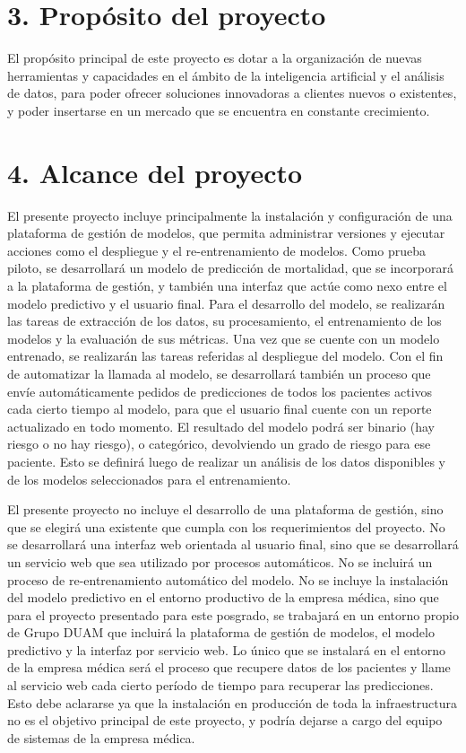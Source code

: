 \documentclass[
11pt, %
]{charter}
\begin{document}
\section{3. Propósito del proyecto}
\label{sec:proposito}

El propósito principal de este proyecto es dotar a la organización de nuevas herramientas y capacidades en el ámbito de la inteligencia artificial y el análisis de datos, para poder ofrecer soluciones innovadoras a clientes nuevos o existentes, y poder insertarse en un mercado que se encuentra en constante crecimiento. 

\section{4. Alcance del proyecto}
\label{sec:alcance}

El presente proyecto incluye principalmente la instalación y configuración de una plataforma de gestión de modelos, que permita administrar versiones y ejecutar acciones como el despliegue y el re-entrenamiento de modelos.
Como prueba piloto, se desarrollará un modelo de predicción de mortalidad, que se incorporará a la plataforma de gestión, y también una interfaz que actúe como nexo entre el modelo predictivo y el usuario final.
Para el desarrollo del modelo, se realizarán las tareas de extracción de los datos, su procesamiento, el entrenamiento de los modelos y la evaluación de sus métricas. 
Una vez que se cuente con un modelo entrenado, se realizarán las tareas referidas al despliegue del modelo. 
Con el fin de automatizar la llamada al modelo, se desarrollará también un proceso que envíe automáticamente pedidos de predicciones de todos los pacientes activos cada cierto tiempo al modelo, para que el usuario final cuente con un reporte actualizado en todo momento.
El resultado del modelo podrá ser binario (hay riesgo o no hay riesgo), o categórico, devolviendo un grado de riesgo para ese paciente. Esto se definirá luego de realizar un análisis de los datos disponibles y de los modelos seleccionados para el entrenamiento.

El presente proyecto no incluye el desarrollo de una plataforma de gestión, sino que se elegirá una existente que cumpla con los requerimientos del proyecto. No se desarrollará una interfaz web orientada al usuario final, sino que se desarrollará un servicio web que sea utilizado por procesos automáticos. No se incluirá un proceso de re-entrenamiento automático del modelo.
No se incluye la instalación del modelo predictivo en el entorno productivo de la empresa médica, sino que para el proyecto presentado para este posgrado, se trabajará en un entorno propio de Grupo DUAM que incluirá la plataforma de gestión de modelos, el modelo predictivo y la interfaz por servicio web. Lo único que se instalará en el entorno de la empresa médica será el proceso que recupere datos de los pacientes y llame al servicio web cada cierto período de tiempo para recuperar las predicciones. Esto debe aclararse ya que la instalación en producción de toda la infraestructura no es el objetivo principal de este proyecto, y podría dejarse a cargo del equipo de sistemas de la empresa médica.
\end{document}

